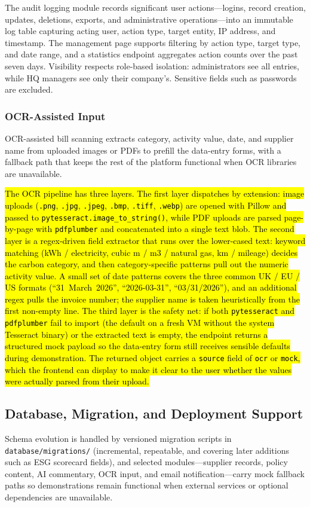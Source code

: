 \documentclass[11pt,a4paper]{article}
\newcommand{\new}[1]{\hl{#1}}
\begin{document}
The audit logging module records significant user actions---logins, record creation, updates, deletions, exports, and administrative operations---into an immutable log table capturing acting user, action type, target entity, IP address, and timestamp. The management page supports filtering by action type, target type, and date range, and a statistics endpoint aggregates action counts over the past seven days. Visibility respects role-based isolation: administrators see all entries, while HQ managers see only their company's. Sensitive fields such as passwords are excluded.

\subsubsection{OCR-Assisted Input}
OCR-assisted bill scanning extracts category, activity value, date, and supplier name from uploaded images or PDFs to prefill the data-entry forms, with a fallback path that keeps the rest of the platform functional when OCR libraries are unavailable.

\new{The OCR pipeline has three layers. The first layer dispatches by extension: image uploads (\texttt{.png}, \texttt{.jpg}, \texttt{.jpeg}, \texttt{.bmp}, \texttt{.tiff}, \texttt{.webp}) are opened with Pillow and passed to \texttt{pytesseract.image\_to\_string()}, while PDF uploads are parsed page-by-page with \texttt{pdfplumber} and concatenated into a single text blob. The second layer is a regex-driven field extractor that runs over the lower-cased text: keyword matching (kWh / electricity, cubic m / m3 / natural gas, km / mileage) decides the carbon category, and then category-specific patterns pull out the numeric activity value. A small set of date patterns covers the three common UK / EU / US formats (``31~March~2026'', ``2026-03-31'', ``03/31/2026''), and an additional regex pulls the invoice number; the supplier name is taken heuristically from the first non-empty line. The third layer is the safety net: if both \texttt{pytesseract} and \texttt{pdfplumber} fail to import (the default on a fresh VM without the system Tesseract binary) or the extracted text is empty, the endpoint returns a structured mock payload so the data-entry form still receives sensible defaults during demonstration. The returned object carries a \texttt{source} field of \texttt{ocr} or \texttt{mock}, which the frontend can display to make it clear to the user whether the values were actually parsed from their upload.}

\subsection{Database, Migration, and Deployment Support}
Schema evolution is handled by versioned migration scripts in \texttt{database/migrations/} (incremental, repeatable, and covering later additions such as ESG scorecard fields), and selected modules---supplier records, policy content, AI commentary, OCR input, and email notification---carry mock fallback paths so demonstrations remain functional when external services or optional dependencies are unavailable.
\end{document}
